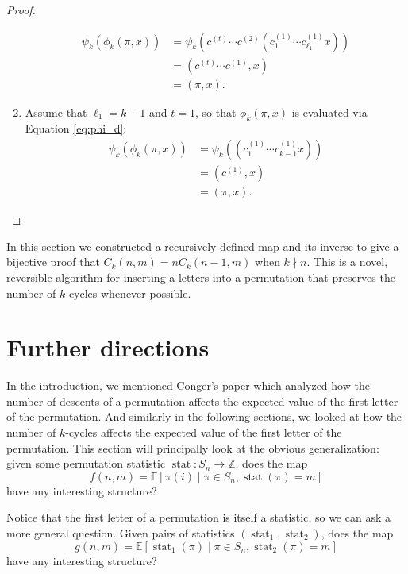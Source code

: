 \begin{proof}
\begin{enumerate}[leftmargin=*, label={\textbf{Case \arabic*.}}]
\begin{align}
      \psi_k(\phi_k(\pi, x))
      &= \psi_k(c^{(t)} \cdots c^{(2)} (c^{(1)}_1 \cdots c^{(1)}_{\ell_1} x)) \\
      &= (c^{(t)}\cdots c^{(1)},x) \\
      &= (\pi, x).
    \end{align}
    \item Assume that $\ell_1 = k-1$ and $t = 1$, so that $\phi_k(\pi,x)$ is evaluated via Equation \eqref{eq:phi_d}: \begin{align}
      \psi_k(\phi_k(\pi, x))
      &= \psi_k((c^{(1)}_1 \cdots c^{(1)}_{k-1  } x)) \\
      &= (c^{(1)},x) \\
      &= (\pi, x).
    \end{align}
  \end{enumerate}
\end{proof}
In this section we constructed a recursively defined map and its inverse to
give a bijective proof that $C_k(n,m) = nC_k(n-1,m)$ when $k \nmid n$. This
is a novel, reversible algorithm for inserting a letters into a permutation
that preserves the number of $k$-cycles whenever possible.
\section{Further directions}
\label{section:furtherDirections}
In the introduction, we mentioned Conger's paper which analyzed how the number
of descents of a permutation affects the expected value of the first letter
of the permutation.
And similarly in the following sections, we looked at how the number of $k$-cycles
affects the expected value of the first letter of the permutation.
This section will principally look at the obvious generalization: given some
permutation statistic $\operatorname{stat}\colon S_n \rightarrow \mathbb Z$,
does the map \begin{equation}
  f(n,m) = \mathbb E[\pi(i) \mid \pi \in S_n, \operatorname{stat}(\pi)=m]
\end{equation} have any interesting structure?

Notice that the first letter of a permutation is itself a statistic, so
we can ask a more general question. Given pairs of statistics
$(\operatorname{stat}_1, \operatorname{stat}_2)$, does the map
\begin{equation}
  g(n,m) = \mathbb E[\operatorname{stat}_1(\pi) \mid \pi \in S_n, \operatorname{stat}_2(\pi)=m]
\end{equation} have any interesting structure?


